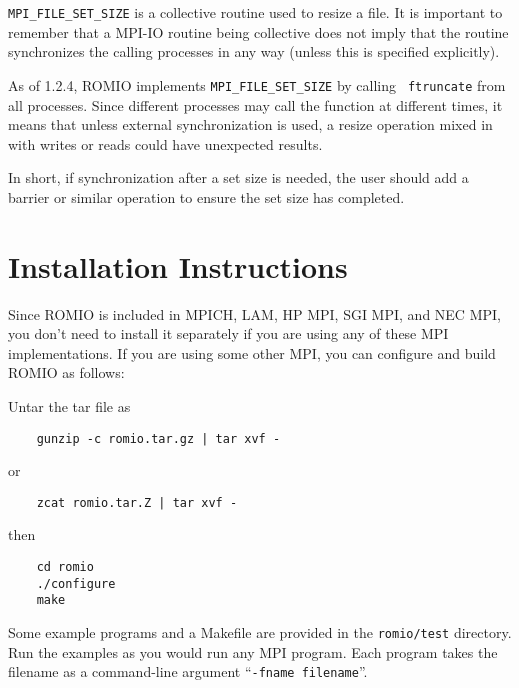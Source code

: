 {\tt MPI\_FILE\_SET\_SIZE} is a collective routine used to resize a file.  It
is important to remember that a MPI-IO routine being collective does not imply
that the routine synchronizes the calling processes in any way (unless this is
specified explicitly).

As of 1.2.4, ROMIO implements {\tt MPI\_FILE\_SET\_SIZE} by calling {\tt
ftruncate} from all processes.  Since different processes may call the
function at different times, it means that unless external synchronization is
used, a resize operation mixed in with writes or reads could have unexpected
results.

In short, if synchronization after a set size is needed, the user should add a
barrier or similar operation to ensure the set size has completed.


%
%
\section{Installation Instructions}
Since ROMIO is included in MPICH, LAM, HP MPI, SGI MPI, and NEC MPI, you don't
need to install it separately if you are using any of these MPI
implementations.  If you are using some other MPI, you
can configure and build ROMIO as follows: 

Untar the tar file as
\begin{verbatim}
    gunzip -c romio.tar.gz | tar xvf -
\end{verbatim}
{\noindent or}
\begin{verbatim}
    zcat romio.tar.Z | tar xvf -
\end{verbatim}

{\noindent then}

\begin{verbatim}
    cd romio
    ./configure
    make
\end{verbatim}

Some example programs and a Makefile are provided in the {\tt romio/test}
directory.  Run the examples as you would run any MPI program. Each
program takes the filename as a command-line argument ``{\tt -fname
filename}''.

